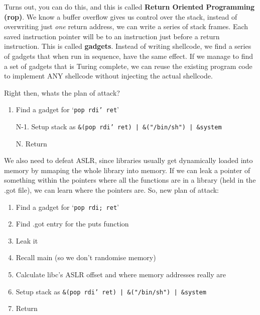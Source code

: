\documentclass[11pt,a4paper,titlepage,dvipsnames,cmyk]{scrartcl}
\begin{document}
Turns out, you can do this, and this is called \textbf{Return Oriented Programming (rop)}. We know a buffer overflow gives us control over the stack, instead of overwriting just \textit{one} return address, we can write a series of stack frames. Each saved instruction pointer will be to an instruction just before a return instruction. This is called \textbf{gadgets}. Instead of writing shellcode, we find a series of gadgets that when run in sequence, have the same effect. If we manage to find a set of gadgets that is Turing complete, we can reuse the existing program code to implement ANY shellcode without injecting the actual shellcode.

\newpage
Right then, whats the plan of attack?
\begin{enumerate}
\item Find a gadget for `\texttt{pop rdi' ret}'
\item[N-1.] Setup stack as \texttt{\&(pop rdi' ret) | \&("/bin/sh") | \&system}
\item[N.] Return
\end{enumerate}

We also need to defeat ASLR, since libraries usually get dynamically loaded into memory by mmaping the whole library into memory. If we can leak a pointer of something within the pointers where all the functions are in a library (held in the .got file), we can learn where the pointers are. So, new plan of attack:
\begin{enumerate}
\item Find a gadget for `\texttt{pop rdi; ret}'
\item Find .got entry for the puts function
\item Leak it
\item Recall main (so we don't randomise memory)
\item Calculate libc's ASLR offset and where memory addresses really are
\item Setup stack as \texttt{\&(pop rdi' ret) | \&("/bin/sh") | \&system}
\item Return
\end{enumerate}
\end{document}
